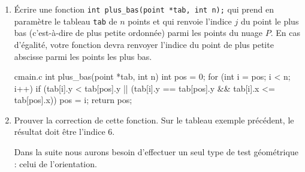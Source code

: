 \documentclass[a4paper,french,bookmarks]{article}
\begin{document}
\begin{enumerate}
    \item Écrire une fonction \verb|int plus_bas(point *tab, int n);| qui prend en paramètre le tableau \verb|tab| de $n$ points et qui renvoie l’indice $j$ du point le plus bas (c’est-à-dire de plus petite ordonnée) parmi les points du nuage $P$. En cas d’égalité, votre fonction devra renvoyer l’indice du point de plus petite abscisse parmi les points les plus bas.
    
    \begin{code}{c}{main.c}
int plus_bas(point *tab, int n) {
    int pos = 0;
    for (int i = pos; i < n; i++) {
        if (tab[i].y < tab[pos].y ||
                (tab[i].y == tab[pos].y && tab[i].x <= tab[pos].x)) {
            pos = i;
        }
    }
    return pos;
}
    \end{code}

    \item Prouver la correction de cette fonction. Sur le tableau exemple précédent, le résultat doit être l’indice 6.
    
    
    Dans la suite nous aurons besoin d’effectuer un seul type de test géométrique : celui de l’orientation.
\end{enumerate}
\end{document}
